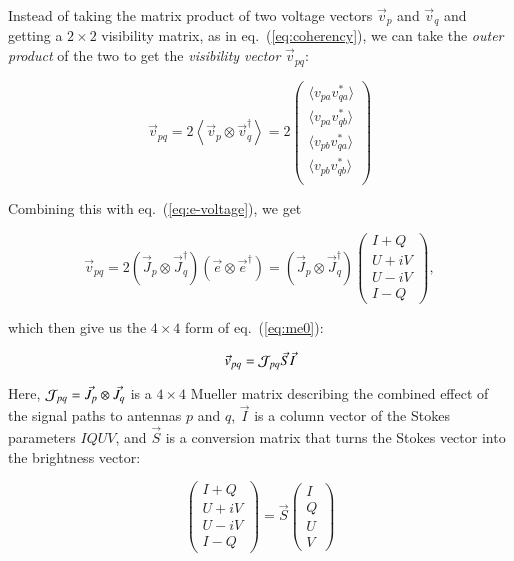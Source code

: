 \documentclass[]{aa}
\begin{document}
Instead of taking the matrix product of two voltage vectors $\vec v_p$ and $\vec v_q$ and getting a $2\times2$ visibility matrix, as in eq.~(\ref{eq:coherency}), we can take the {\em outer product} of the two to get the {\em visibility vector} $\vec v_{pq}$:

\[
\vec v_{pq} = 2 \left< \vec v_p \otimes \vec v^\dagger_q \right > = 2 \left ( 
\begin{array}{c}
    \langle v_{pa}v^*_{qa}\rangle \\ \langle v_{pa}v^*_{qb}\rangle \\
    \langle v_{pb}v^*_{qa}\rangle \\ \langle v_{pb}v^*_{qb}\rangle \\
\end{array} 
\right ) 
\]

Combining this with eq.~(\ref{eq:e-voltage}), we get

\[
    \vec v_{pq} = 2 ( \vec J_p \otimes \vec J^\dagger_q ) (\vec e \otimes \vec e^\dagger )
 = ( \vec J_p \otimes \vec J^\dagger_q ) 
\left ( \begin{array}{c}
I+Q \\ U+iV \\ U-iV \\ I-Q
\end{array} \right ), 
\]

which then give us the $4\times4$ form of eq.~(\ref{eq:me0}):

    \begin{equation}\label{eq:me:mueller}
    \vec v_{pq} = {\cal J}_{pq} \vec S \vec I
    \end{equation}

Here, ${\cal J}_{pq}=\vec J_p \otimes \vec J_q$ is a $4\times4$ Mueller matrix describing the combined effect of the signal paths to antennas $p$ and $q$, $\vec I$ is a column vector of the Stokes parameters $IQUV$, and $\vec S$ is a conversion matrix that turns the Stokes vector into the brightness vector:

\[
\left ( \begin{array}{c}
I+Q \\ U+iV \\ U-iV \\ I-Q
\end{array} \right ) 
= \vec S 
\left ( \begin{array}{c}
I \\ Q \\ U \\ V
\end{array} \right ) 
\]
\end{document}
